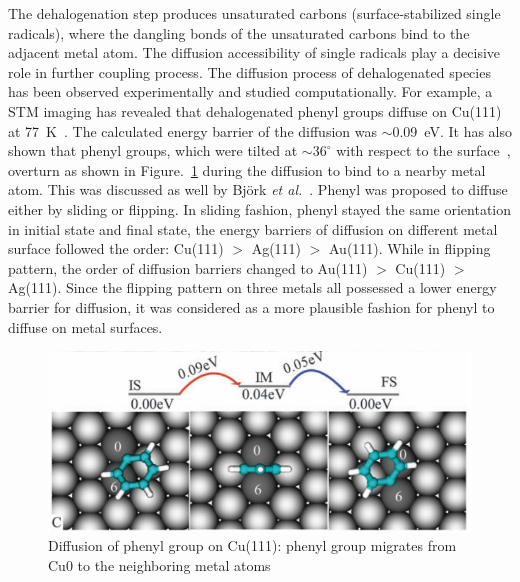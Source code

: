 \documentclass[%
 reprint,
 amsmath,amssymb,
 aps,
prb,
]{revtex4-2}
\begin{document}
The dehalogenation step produces unsaturated carbons (surface-stabilized single radicals), where the dangling bonds of the unsaturated carbons bind to the adjacent metal atom. The diffusion accessibility of single radicals play a decisive role in further coupling process. 
%
The diffusion process of dehalogenated species has been observed experimentally and studied computationally. For example, a STM imaging has revealed that dehalogenated phenyl groups diffuse on Cu(111) at 77~K~\cite{langm01}. The calculated energy barrier of the diffusion was $\sim$0.09~eV. It has also shown that phenyl groups, which were tilted at $\sim 36^\circ$ with respect to the surface~\cite{pccp2010}, overturn as shown in Figure.~\ref{fig:4} during the diffusion to bind to a nearby metal atom. This was discussed as well by Björk \textit{et al.}~\cite{jacs2013}. Phenyl was proposed to diffuse either by sliding or flipping. In sliding fashion, phenyl stayed the same orientation in initial state and final state, the energy barriers of diffusion on different metal surface followed the order: Cu(111) $>$ Ag(111) $>$ Au(111). While in flipping pattern, the order of diffusion barriers changed to Au(111) $>$ Cu(111) $>$ Ag(111). Since the flipping pattern on three metals all possessed a lower energy barrier for diffusion, it was considered as a more plausible fashion for phenyl to diffuse on metal surfaces.

\begin{figure}[htb]
\centering
\includegraphics[width=0.75\columnwidth]{Fig/overturn.png}
\caption{Diffusion of phenyl group on Cu(111): phenyl group migrates from Cu0 to the neighboring metal atoms} %
\label{fig:4}
\end{figure}
\end{document}
